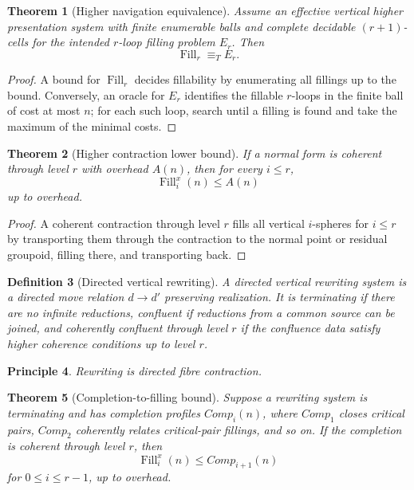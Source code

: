 \documentclass[11pt]{article}
\newtheorem{theorem}{Theorem}[section]
\newtheorem{definition}[theorem]{Definition}
\newtheorem{principle}[theorem]{Principle}
\DeclareMathOperator{\Fill}{Fill}
\begin{document}
\begin{theorem}[Higher navigation equivalence]
Assume an effective vertical higher presentation system with finite enumerable balls and complete decidable \((r+1)\)-cells for the intended \(r\)-loop filling problem \(E_r\).  Then
\[
\Fill_r\equiv_T E_r.
\]
\end{theorem}

\begin{proof}
A bound for \(\Fill_r\) decides fillability by enumerating all fillings up to the bound.  Conversely, an oracle for \(E_r\) identifies the fillable \(r\)-loops in the finite ball of cost at most \(n\); for each such loop, search until a filling is found and take the maximum of the minimal costs.
\end{proof}

\begin{theorem}[Higher contraction lower bound]
If a normal form is coherent through level \(r\) with overhead \(A(n)\), then for every \(i\le r\),
\[
\Fill_i^x(n)\le A(n)
\]
up to overhead.
\end{theorem}

\begin{proof}
A coherent contraction through level \(r\) fills all vertical \(i\)-spheres for \(i\le r\) by transporting them through the contraction to the normal point or residual groupoid, filling there, and transporting back.
\end{proof}

\begin{definition}[Directed vertical rewriting]
A directed vertical rewriting system is a directed move relation \(d\to d'\) preserving realization.  It is terminating if there are no infinite reductions, confluent if reductions from a common source can be joined, and coherently confluent through level \(r\) if the confluence data satisfy higher coherence conditions up to level \(r\).
\end{definition}

\begin{principle}
Rewriting is directed fibre contraction.
\end{principle}

\begin{theorem}[Completion-to-filling bound]
Suppose a rewriting system is terminating and has completion profiles \(Comp_i(n)\), where \(Comp_1\) closes critical pairs, \(Comp_2\) coherently relates critical-pair fillings, and so on.  If the completion is coherent through level \(r\), then
\[
\Fill_i^x(n)\le Comp_{i+1}(n)
\]
for \(0\le i\le r-1\), up to overhead.
\end{theorem}
\end{document}
